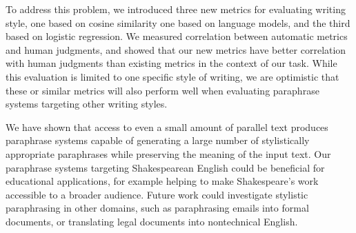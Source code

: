 \documentclass[10pt,a5paper,twoside]{article}
\begin{document}
To address this problem, we introduced three new metrics for evaluating writing style, one based on cosine similarity one based on
language models, and the third based on logistic regression.
We measured correlation between automatic metrics and human judgments, and showed
that our new metrics have better correlation with human judgments than existing metrics in the context of our task.
While this evaluation is limited to one specific style of writing, we are optimistic that these or similar metrics will also perform well when
evaluating paraphrase systems targeting other writing styles.

We have shown that access to even a small amount of parallel text produces paraphrase systems 
capable of generating a large number of stylistically appropriate paraphrases while preserving the meaning of the input text.  
Our paraphrase systems targeting Shakespearean English could be beneficial for educational applications, for example helping to
make Shakespeare's work accessible to a broader audience.
Future work could investigate stylistic paraphrasing in other domains, such as paraphrasing emails into formal documents, or
translating legal documents into nontechnical English. 




\end{document}
